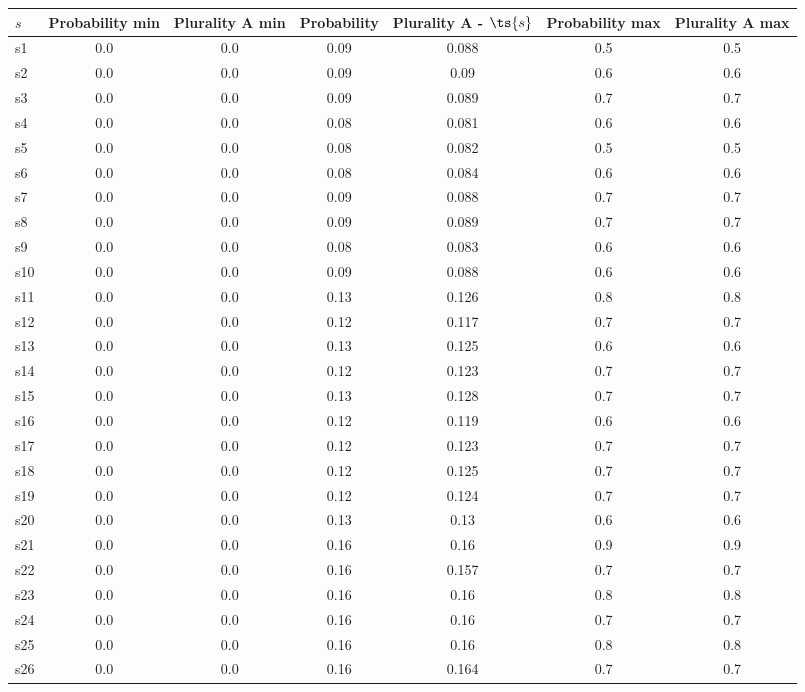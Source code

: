 \documentclass{article}
\begin{document}
\noindent\begin{tabular}{|l|c|c|c|c|c|c|}
\hline
$s$& Probability min & Plurality A min & Probability & Plurality A - $\ts{s}$ & Probability max & Plurality A max\\
\hline
s1 &0.0 & 0.0 & 0.09 & 0.088 & 0.5 & 0.5\\
\hline
s2 &0.0 & 0.0 & 0.09 & 0.09 & 0.6 & 0.6\\
\hline
s3 &0.0 & 0.0 & 0.09 & 0.089 & 0.7 & 0.7\\
\hline
s4 &0.0 & 0.0 & 0.08 & 0.081 & 0.6 & 0.6\\
\hline
s5 &0.0 & 0.0 & 0.08 & 0.082 & 0.5 & 0.5\\
\hline
s6 &0.0 & 0.0 & 0.08 & 0.084 & 0.6 & 0.6\\
\hline
s7 &0.0 & 0.0 & 0.09 & 0.088 & 0.7 & 0.7\\
\hline
s8 &0.0 & 0.0 & 0.09 & 0.089 & 0.7 & 0.7\\
\hline
s9 &0.0 & 0.0 & 0.08 & 0.083 & 0.6 & 0.6\\
\hline
s10 &0.0 & 0.0 & 0.09 & 0.088 & 0.6 & 0.6\\
\hline
s11 &0.0 & 0.0 & 0.13 & 0.126 & 0.8 & 0.8\\
\hline
s12 &0.0 & 0.0 & 0.12 & 0.117 & 0.7 & 0.7\\
\hline
s13 &0.0 & 0.0 & 0.13 & 0.125 & 0.6 & 0.6\\
\hline
s14 &0.0 & 0.0 & 0.12 & 0.123 & 0.7 & 0.7\\
\hline
s15 &0.0 & 0.0 & 0.13 & 0.128 & 0.7 & 0.7\\
\hline
s16 &0.0 & 0.0 & 0.12 & 0.119 & 0.6 & 0.6\\
\hline
s17 &0.0 & 0.0 & 0.12 & 0.123 & 0.7 & 0.7\\
\hline
s18 &0.0 & 0.0 & 0.12 & 0.125 & 0.7 & 0.7\\
\hline
s19 &0.0 & 0.0 & 0.12 & 0.124 & 0.7 & 0.7\\
\hline
s20 &0.0 & 0.0 & 0.13 & 0.13 & 0.6 & 0.6\\
\hline
s21 &0.0 & 0.0 & 0.16 & 0.16 & 0.9 & 0.9\\
\hline
s22 &0.0 & 0.0 & 0.16 & 0.157 & 0.7 & 0.7\\
\hline
s23 &0.0 & 0.0 & 0.16 & 0.16 & 0.8 & 0.8\\
\hline
s24 &0.0 & 0.0 & 0.16 & 0.16 & 0.7 & 0.7\\
\hline
s25 &0.0 & 0.0 & 0.16 & 0.16 & 0.8 & 0.8\\
\hline
s26 &0.0 & 0.0 & 0.16 & 0.164 & 0.7 & 0.7\\
\hline

\end{tabular}
\end{document}
